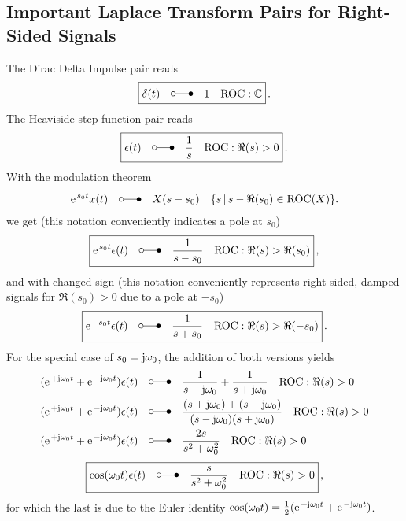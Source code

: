 \documentclass[a4paper,11pt,oneside]{scrartcl}
\begin{document}
\subsection*{Important Laplace Transform Pairs for Right-Sided Signals}
The Dirac Delta Impulse pair reads
\begin{align}
\boxed{\delta(t) \quad \laplace \quad 1 \quad \text{ROC}: \mathbb{C}}\,.
\end{align}
The Heaviside step function pair reads
\begin{align}
\boxed{\epsilon(t) \quad \laplace \quad \frac{1}{s} \quad \text{ROC}: \Re(s)>0}\,.
\end{align}
With the modulation theorem
\begin{align}
\e^{s_0 t} x(t) \quad \laplace \quad X(s-s_0) \quad \{s \, | \, s-\Re(s_0) \in \text{ROC}(X)\}.
\end{align}
we get (this notation conveniently indicates a pole at $s_0$)
\begin{align}
\boxed{\e^{s_0 t} \epsilon(t)\quad \laplace \quad \frac{1}{s-s_0} \quad \text{ROC}: \Re(s)>\Re(s_0)}\,,
\end{align}
and with changed sign (this notation conveniently represents right-sided,
damped signals for $\Re(s_0)>0$ due to a pole at $-s_0$)
\begin{align}
\boxed{\e^{-s_0 t} \epsilon(t)\quad \laplace \quad \frac{1}{s+s_0} \quad \text{ROC}: \Re(s)>\Re(-s_0)}\,.
\end{align}
%
For the special case of $s_0 = \im \omega_0$, the addition of both versions
yields
\begin{align}
(\e^{+\im \omega_0 t} + \e^{-\im \omega_0 t})  \epsilon(t)\quad &\laplace \quad \frac{1}{s-\im \omega_0} + \frac{1}{s+\im \omega_0} \quad \text{ROC}: \Re(s)>0\\
(\e^{+\im \omega_0 t} + \e^{-\im \omega_0 t})  \epsilon(t)\quad &\laplace \quad \frac{(s+\im \omega_0) + (s-\im \omega_0)}{(s-\im \omega_0)(s+\im \omega_0)}\quad \text{ROC}: \Re(s)>0\\
(\e^{+\im \omega_0 t} + \e^{-\im \omega_0 t})  \epsilon(t)\quad &\laplace \quad \frac{2 s}{s^2 + \omega_0^2}\quad \text{ROC}: \Re(s)>0
\end{align}
\begin{align}
\boxed{\cos(\omega_0 t) \epsilon(t)\quad \laplace \quad \frac{s}{s^2 + \omega_0^2}\quad \text{ROC}: \Re(s)>0}\,,
\end{align}
for which the last is due to the Euler identity $\cos(\omega_0 t) = \frac{1}{2} (\e^{+\im \omega_0 t}+\e^{-\im \omega_0 t})$.
\end{document}
